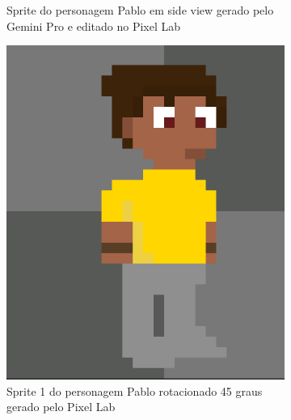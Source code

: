 \begin{figure}[htbp]
\begin{subfigure}{0.23\linewidth}
        \caption{\small Sprite do personagem Pablo em side view gerado pelo Gemini Pro e editado no Pixel Lab}
        \label{fig:geminiProPabloPixelLabSide}
    \end{subfigure}
    \begin{subfigure}{0.23\linewidth}
        \centering
        \includegraphics[width=1\linewidth]{figs/pixelLab/dia2/fix_teste_3.PNG}
        \caption{\small Sprite 1 do personagem Pablo rotacionado 45 graus gerado pelo Pixel Lab}
        \label{fig:geminiProPabloPixelLab45_1}
    \end{subfigure}
    \begin{subfigure}{0.23\linewidth}
        \centering

\end{subfigure}
\end{figure}
